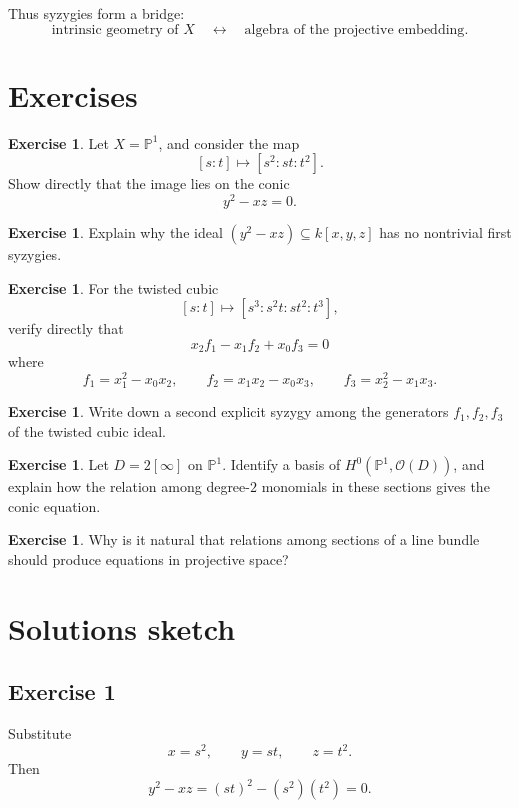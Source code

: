 \documentclass[11pt]{article}
\theoremstyle{definition}
\newtheorem{exercise}[theorem]{Exercise}
\theoremstyle{remark}
\newcommand{\PP}{\mathbb{P}}
\newcommand{\cO}{\mathcal{O}}
\begin{document}
	Thus syzygies form a bridge:
	\[
	\text{intrinsic geometry of }X
	\quad\longleftrightarrow\quad
	\text{algebra of the projective embedding}.
	\]
	
	\section{Exercises}
	
	\begin{exercise}
		Let \(X=\PP^1\), and consider the map
		\[
		[s:t]\mapsto [s^2:st:t^2].
		\]
		Show directly that the image lies on the conic
		\[
		y^2-xz=0.
		\]
	\end{exercise}
	
	\begin{exercise}
		Explain why the ideal \((y^2-xz)\subseteq k[x,y,z]\) has no nontrivial first syzygies.
	\end{exercise}
	
	\begin{exercise}
		For the twisted cubic
		\[
		[s:t]\mapsto [s^3:s^2t:st^2:t^3],
		\]
		verify directly that
		\[
		x_2f_1-x_1f_2+x_0f_3=0
		\]
		where
		\[
		f_1=x_1^2-x_0x_2,\qquad
		f_2=x_1x_2-x_0x_3,\qquad
		f_3=x_2^2-x_1x_3.
		\]
	\end{exercise}
	
	\begin{exercise}
		Write down a second explicit syzygy among the generators \(f_1,f_2,f_3\) of the twisted cubic ideal.
	\end{exercise}
	
	\begin{exercise}
		Let \(D=2[\infty]\) on \(\PP^1\). Identify a basis of \(H^0(\PP^1,\cO(D))\), and explain how the relation among degree-\(2\) monomials in these sections gives the conic equation.
	\end{exercise}
	
	\begin{exercise}
		Why is it natural that relations among sections of a line bundle should produce equations in projective space?
	\end{exercise}
	
	\section{Solutions sketch}
	
	\subsection*{Exercise 1}
	Substitute
	\[
	x=s^2,\qquad y=st,\qquad z=t^2.
	\]
	Then
	\[
	y^2-xz=(st)^2-(s^2)(t^2)=0.
	\]
	
\end{document}
